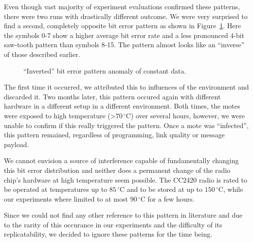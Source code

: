 Even though vast majority of experiment evaluations confirmed these patterns, there were two runs with  drastically different outcome.
We were very surprised to find a second, completely opposite bit error pattern as shown in Figure~\ref{fig:anomalie_bit_error}.
Here the symbols 0-7 show a higher average bit error rate and a less pronounced 4-bit saw-tooth pattern than symbols 8-15.
The pattern almost looks like an ``inverse'' of those described earlier.

\begin{figure}[H]
	\caption{``Inverted'' bit error pattern anomaly of constant data.}
	\label{fig:anomalie_bit_error}
\end{figure}

The first time it occurred, we attributed this to influences of the environment and discarded it.
Two months later, this pattern occured again with different hardware in a different setup in a different environment.
Both times, the motes were exposed to high temperature (>$70\,^{\circ}\mathrm{C}$) over several hours, however, we were unable to confirm if this really triggered the pattern.
Once a mote was ``infected'', this pattern remained, regardless of programming, link quality or message payload.

We cannot envision a source of interference capable of fundamentally changing this bit error distribution and neither does a permanent change of the radio chip's hardware at high temperature seem possible.
The CC2420 radio is rated to be operated at temperatures up to $85\,^{\circ}\mathrm{C}$ and to be stored at up to $150\,^{\circ}\mathrm{C}$, while our experiments where limited to at most $90\,^{\circ}\mathrm{C}$ for a few hours.

Since we could not find any other reference to this pattern in literature and due to the rarity of this occurance in our experiments and the difficulty of its replicatability, we decided to ignore these patterns for the time being.










































